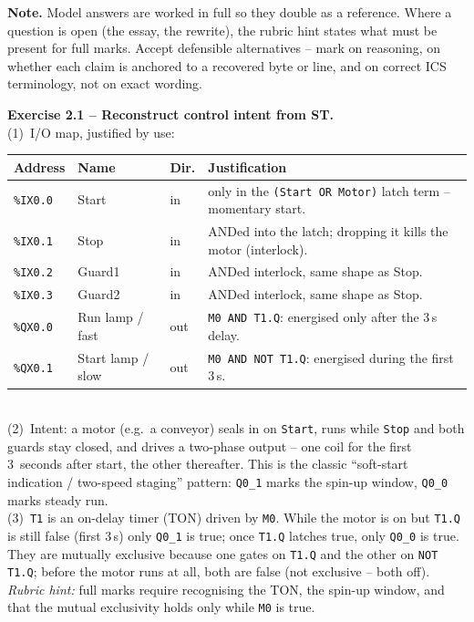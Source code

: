 \documentclass[11pt,a4paper]{article}
\begin{document}
\sheetheader

\noindent
\textbf{Note.} Model answers are worked in full so they double as a reference. Where a question is
open (the essay, the rewrite), the rubric hint states what must be present for full marks. Accept
defensible alternatives -- mark on reasoning, on whether each claim is anchored to a recovered byte
or line, and on correct ICS terminology, not on exact wording.

\begin{solutionbox}
\textbf{Exercise 2.1 -- Reconstruct control intent from ST.}\\[2pt]
(1)~I/O map, justified by use:
\par\begin{tabular}{p{2.0cm} p{2.4cm} p{1.6cm} p{6.6cm}}
\toprule
\textbf{Address} & \textbf{Name} & \textbf{Dir.} & \textbf{Justification} \\
\midrule
\texttt{\%IX0.0} & Start    & in  & only in the \texttt{(Start OR Motor)} latch term -- momentary start. \\
\texttt{\%IX0.1} & Stop     & in  & ANDed into the latch; dropping it kills the motor (interlock). \\
\texttt{\%IX0.2} & Guard1   & in  & ANDed interlock, same shape as Stop. \\
\texttt{\%IX0.3} & Guard2   & in  & ANDed interlock, same shape as Stop. \\
\texttt{\%QX0.0} & Run lamp / fast & out & \texttt{M0 AND T1.Q}: energised only after the 3\,s delay. \\
\texttt{\%QX0.1} & Start lamp / slow & out & \texttt{M0 AND NOT T1.Q}: energised during the first 3\,s. \\
\bottomrule
\end{tabular}\\[3pt]
(2)~Intent: a motor (e.g.\ a conveyor) seals in on \texttt{Start}, runs while \texttt{Stop} and
both guards stay closed, and drives a two-phase output -- one coil for the first 3~seconds after
start, the other thereafter. This is the classic ``soft-start indication / two-speed staging''
pattern: \texttt{Q0\_1} marks the spin-up window, \texttt{Q0\_0} marks steady run.\\
(3)~\texttt{T1} is an on-delay timer (TON) driven by \texttt{M0}. While the motor is on but
\texttt{T1.Q} is still false (first 3\,s) only \texttt{Q0\_1} is true; once \texttt{T1.Q} latches
true, only \texttt{Q0\_0} is true. They are mutually exclusive because one gates on \texttt{T1.Q}
and the other on \texttt{NOT T1.Q}; before the motor runs at all, both are false (not exclusive --
both off).\\[2pt]
\emph{Rubric hint:} full marks require recognising the TON, the spin-up window, and that the
mutual exclusivity holds only while \texttt{M0} is true.
\end{solutionbox}
\end{document}

